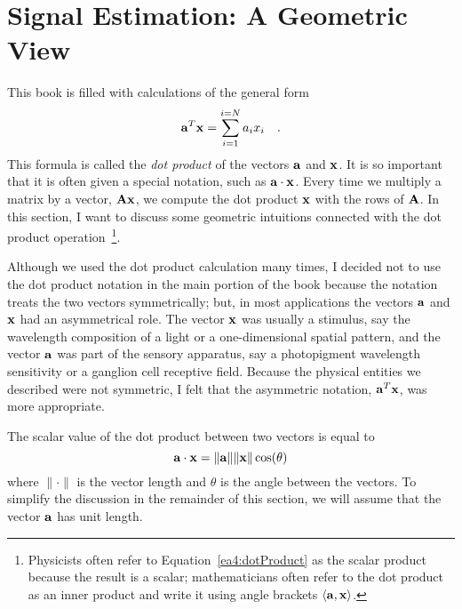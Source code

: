 
\chapter{Signal Estimation:  A Geometric View}
\label{chapter:signalEstimation}
This book is filled with calculations of the general form
\begin{equation}
\label{ea4:dotProduct}
\mbox{${\bf a}$}^T \mbox{${\bf x}$} = \sum_{i=1}^{i=N} a_i x_i ~~~.
\end{equation}
This formula is called the {\em dot product} of the vectors $\mbox{${\bf a}$}$
and $\mbox{${\bf x}$}$.  It is so important that it is often given a special
notation, such as $\mbox{${\bf a}$} \cdot \mbox{${\bf x}$}$.  Every time we multiply a
matrix by a vector, $\mbox{${\bf A}$} \mbox{${\bf x}$}$, we compute the dot product
$\mbox{${\bf x}$}$ with the rows of $\mbox{${\bf A}$}$.  In this section, I want to
discuss some geometric intuitions connected with the dot product
operation~\footnote{Physicists often refer to
Equation~\ref{ea4:dotProduct} as the scalar product because the result
is a scalar; mathematicians often refer to the dot product as an inner
product and write it using angle brackets $\langle {\mbox{${\bf a}$}} ,
{\mbox{${\bf x}$}}
\rangle$.}.

Although we used the dot product calculation many times, I decided not
to use the dot product notation in the main portion of the book
because the notation treats the two vectors symmetrically; but, in
most applications the vectors $\mbox{${\bf a}$}$ and $\mbox{${\bf x}$}$ had an asymmetrical
role.  The vector $\mbox{${\bf x}$}$ was usually a stimulus, say the wavelength
composition of a light or a one-dimensional spatial pattern, and the
vector $\mbox{${\bf a}$}$ was part of the sensory apparatus, say a photopigment
wavelength sensitivity or a ganglion cell receptive field.  Because
the physical entities we described were not symmetric, I felt that the
asymmetric notation, $\mbox{${\bf a}$}^T \mbox{${\bf x}$}$, was more appropriate.

The scalar value of the dot product between two vectors is equal to
\[
\mbox{${\bf a}$} \cdot \mbox{${\bf x}$} = \| \mbox{${\bf a}$} \| \| \mbox{${\bf x}$} \| \cos( \theta )
\]
where $\| \cdot \|$ is the vector length and $\theta$ is the angle
between the vectors.  To simplify the discussion in the remainder of
this section, we will assume that the vector $\mbox{${\bf a}$}$ has unit length.

